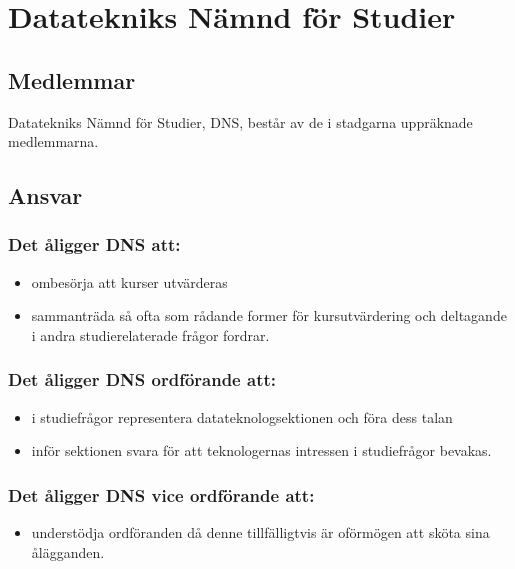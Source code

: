 \section{Datatekniks Nämnd för Studier}
\subsection{Medlemmar}
Datatekniks Nämnd för Studier, DNS, består av de i stadgarna uppräknade medlemmarna.
\subsection{Ansvar}
\subsubsection{Det åligger DNS att:}
\begin{itemize}
  \item ombesörja att kurser utvärderas
  \item sammanträda så ofta som rådande former för kursutvärdering och deltagande i andra studierelaterade frågor fordrar.
\end{itemize}
\subsubsection{Det åligger DNS ordförande att:}
\begin{itemize}
  \item i studiefrågor representera datateknologsektionen och föra dess talan
  \item inför sektionen svara för att teknologernas intressen i studiefrågor bevakas.
\end{itemize}
\subsubsection{Det åligger DNS vice ordförande att:}
\begin{itemize}
  \item understödja ordföranden då denne tillfälligtvis är oförmögen att sköta sina ålägganden.
\end{itemize}
\newpage
